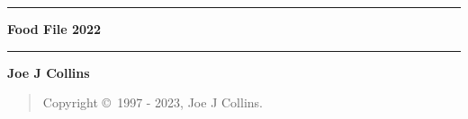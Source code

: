 \documentclass{./FoodFile}
\begin{document}
\thispagestyle{empty}
\begin{center}
\hrule
\vspace{5mm}
{\Huge\bf Food File 2022}
\vspace{5mm}
\hrule
\vfill
{\bf Joe J Collins}
\end{center}
\clearpage
\strut %
\vfill
\begin{quotation}
Copyright \copyright\ 1997 - 2023, Joe J Collins.
\end{quotation}
\clearpage
{}


\printindex
\end{document}
